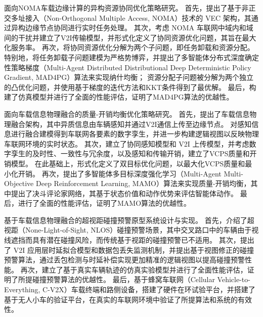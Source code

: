 \begin{cabstract}
 面向NOMA车载边缘计算的异构资源协同优化策略研究。
首先，提出了基于非正交多址接入（Non-Orthogonal Multiple Access, NOMA）技术的 VEC 架构，其通过异构边缘节点协同进行实时任务处理。
其次，考虑 NOMA 车联网中域内和域间的干扰并建立了V2I传输模型，并形式化定义了协同资源优化问题，其旨在最大化服务率。
再次，将协同资源优化分解为两个子问题，即任务卸载和资源分配。
特别地，将任务卸载子问题建模为严格势博弈，并提出了多智能体分布式深度确定性策略梯度（Multi-Agent Distributed Distributional Deep Deterministic Policy Gradient, MAD4PG）算法来实现纳什均衡；
资源分配子问题被分解为两个独立的凸优化问题，并使用基于梯度的迭代方法和KKT条件得到了最优解。
最后，构建了仿真模型并进行了全面的性能评估，证明了MAD4PG算法的优越性。

 面向车载信息物理融合的质量-开销均衡优化策略研究。
首先，提出了车载信息物理融合架构，其中异质信息由车辆感知并通过V2I通信上传至边缘节点。
对感知信息进行融合建模得到车联网各要素的数字孪生，并进一步构建逻辑视图以反映物理车联网环境的实时状态。
其次，建立了协同感知模型和 V2I 上传模型，并考虑数字孪生的及时性、一致性与冗余度，以及感知和传输开销，建立了VCPS质量和开销模型。
在此基础上，形式化定义了双目标优化问题，以最大化VCPS质量和最小化开销。
再次，提出了多智能体多目标深度强化学习（Multi-Agent Multi-Objective Deep Reinforcement Learning, MAMO）算法来实现质量-开销均衡，其中提出了决斗评论家网络，其基于状态价值和动作优势来评估智能体动作。
最后，进行了全面的性能评估，证明了MAMO算法的优越性。

 基于车载信息物理融合的超视距碰撞预警原型系统设计与实现。
首先，介绍了超视距（None-Light-of-Sight, NLOS）碰撞预警场景，其中交叉路口中的车辆由于视线遮挡而具有潜在碰撞风险，而传统基于视距的碰撞预警已不适用。
其次，提出了 V2I 应用层时延拟合模型和数据包丢失监测机制，并提出基于视图修正的碰撞预警算法，通过丢包检测与时延补偿实现更加精准的逻辑视图以提高碰撞预警性能。
再次，建立了基于真实车辆轨迹的仿真实验模型并进行了全面性能评估，证明了所提碰撞预警算法的优越性。
最后，基于蜂窝车联网（Cellular Vehicle-to-Everything, C-V2X）车载终端和路侧设备，搭建了硬件在环试验平台，并搭建了基于无人小车的验证平台，在真实的车联网环境中验证了所提算法和系统的有效性。

\end{cabstract}

